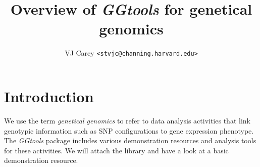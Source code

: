 \documentclass[12pt]{article}
\newcommand{\Rpackage}[1]{{\textit{#1}}}
\begin{document}

\title{Overview of \Rpackage{GGtools} for genetical genomics}
\author{VJ Carey \texttt{<stvjc@channing.harvard.edu>}}
\maketitle

\section{Introduction}

We use the term \textit{genetical genomics} to refer to
data analysis activities that link genotypic information
such as SNP configurations to gene expression phenotype.
The \Rpackage{GGtools} package includes various
demonstration resources and analysis tools for these
activities.
We will attach the library and have a look at a basic
demonstration resource.
\end{document}
